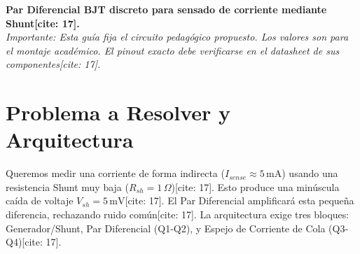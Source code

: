 \documentclass[11pt, a4paper]{article}
\begin{document}
\begin{tcolorbox}[colback=red!5, colframe=red!70!black, title=\textbf{Guía Previa y Lista de Materiales (BOM) — Hito 2}]
    \textbf{Par Diferencial BJT discreto para sensado de corriente mediante Shunt[cite: 17].} \\
    \textit{Importante: Esta guía fija el circuito pedagógico propuesto. Los valores son para el montaje académico. El pinout exacto debe verificarse en el datasheet de sus componentes[cite: 17].}
\end{tcolorbox}

\section{Problema a Resolver y Arquitectura}
Queremos medir una corriente de forma indirecta ($I_{sense} \approx 5\,\text{mA}$) usando una resistencia Shunt muy baja ($R_{sh} = 1\,\Omega$)[cite: 17]. Esto produce una minúscula caída de voltaje $V_{sh} = 5\,\text{mV}$[cite: 17]. El Par Diferencial amplificará esta pequeña diferencia, rechazando ruido común[cite: 17].
La arquitectura exige tres bloques: Generador/Shunt, Par Diferencial (Q1-Q2), y Espejo de Corriente de Cola (Q3-Q4)[cite: 17].
\end{document}
